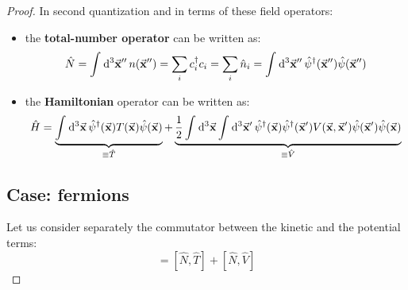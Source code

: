 \documentclass[11pt, a4paper, twoside, openright]{article}
\begin{document}
\begin{proof}
In second quantization and in terms of these field operators:
\begin{itemize}
\item the \textbf{total-number operator} can be written as:
\begin{equation}
  \hat{N} = \int_{}^{} \dd[3]{\va{x}''} n(\va{x}'')
= \sum_{i}^{} c_i ^\dag c_i = \sum_{i}^{} \hat{n}_i =
\int_{}^{} \dd[3]{\va{x}''} \hat{\psi }^\dag (\va{x}'') \hat{\psi }(\va{x}'')
\end{equation}
\item the \textbf{Hamiltonian} operator can be written as:
\begin{equation}
  \hat{H} =
  \underbrace{
   \int_{}^{} \dd[3]{\va{x}} \hat{\psi } ^\dag  (\va{x}) T (\va{x}) \hat{\psi }(\va{x})
   }_{\equiv \hat{T} }
+
\underbrace{
 \frac{1}{2}  \int_{}^{} \dd[3]{\va{x}}
\int_{}^{} \dd[3]{\va{x}'} \hat{\psi } ^\dag (\va{x})
\hat{\psi } ^\dag (\va{x}') V (\va{x},\va{x}') \hat{\psi } (\va{x}') \hat{\psi } (\va{x})
 }_{\equiv \hat{V} }
\end{equation}
\end{itemize}

\subsection*{Case: fermions}
Let us consider separately the commutator between the kinetic and the potential terms:
\begin{equation*}
  [\hat{N}, \hat{H}  ] = [\hat{N}, \hat{T}  ] + [\hat{N}, \hat{V}  ]
\end{equation*}


\end{proof}
\end{document}
